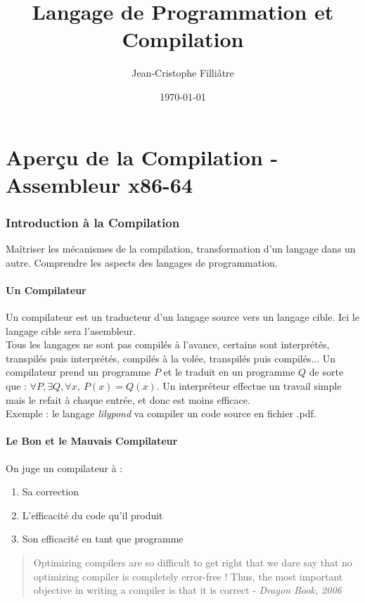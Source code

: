 \documentclass{cours}
\title{Langage de Programmation et Compilation}
\author{Jean-Cristophe Filliâtre}
\date{\today}
\begin{document}
\newpage
\part{Aperçu de la Compilation - Assembleur x86-64}
\localtableofcontents
\section{Introduction à la Compilation}
Maîtriser les mécanismes de la compilation, transformation d'un langage dans un autre. Comprendre les aspects des langages de programmation.\\

\subsection{Un Compilateur}
Un compilateur est un traducteur d'un langage source vers un langage cible. Ici le langage cible sera l'asembleur. \\
Tous les langages ne sont pas compilés à l'avance, certains sont interprétés, transpilés puis interprétés, compilés à la volée, transpilés puis compilés...
Un compilateur prend un programme $P$ et le traduit en un programme $Q$ de sorte que : $\forall P, \exists Q, \forall x, \ P(x) = Q(x)$. Un interpréteur effectue un travail simple mais le refait à chaque entrée, et donc est moins efficace.\\
Exemple : le langage \textsl{lilypond} va compiler un code source en fichier .pdf. \\

\subsection{Le Bon et le Mauvais Compilateur}
On juge un compilateur à : \begin{enumerate}
    \item Sa correction
    \item L'efficacité du code qu'il produit
    \item Son efficacité en tant que programme
\end{enumerate}
\begin{quote}
    \og Optimizing compilers are so difficult to get right that we dare say that no optimizing compiler is completely error-free ! Thus, the most important objective in writing a compiler is that it is correct \fg - \textit{Dragon Book, 2006}
\end{quote}
\end{document}
